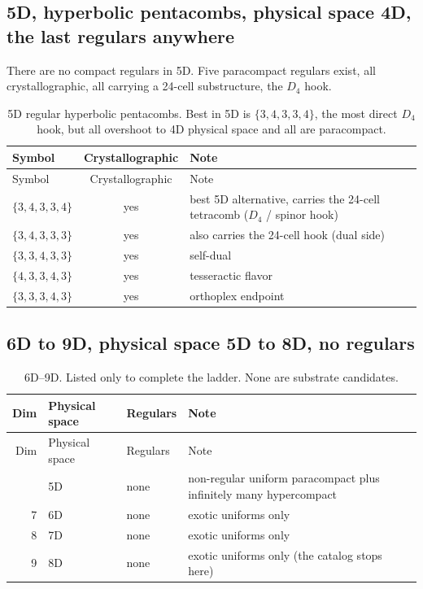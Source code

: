 \subsection{5D, hyperbolic pentacombs, physical space 4D, the last regulars anywhere}

There are no compact regulars in 5D. Five paracompact regulars exist, all crystallographic, all carrying a
24-cell substructure, the $D_4$ hook.

{\small
\begin{longtable}{l c p{4.0in}}
\caption{5D regular hyperbolic pentacombs. Best in 5D is $\{3,4,3,3,4\}$, the most direct $D_4$ hook, but all
overshoot to 4D physical space and all are paracompact.}
\label{tab:catalog-5d}\\
\toprule
Symbol & Crystallographic & Note \\
\midrule
\endfirsthead
\toprule
Symbol & Crystallographic & Note \\
\midrule
\endhead
\bottomrule
\endfoot
$\{3,4,3,3,4\}$ & yes & best 5D alternative, carries the 24-cell tetracomb ($D_4$ / spinor hook) \\
$\{3,4,3,3,3\}$ & yes & also carries the 24-cell hook (dual side) \\
$\{3,3,4,3,3\}$ & yes & self-dual \\
$\{4,3,3,4,3\}$ & yes & tesseractic flavor \\
$\{3,3,3,4,3\}$ & yes & orthoplex endpoint \\
\end{longtable}}

\subsection{6D to 9D, physical space 5D to 8D, no regulars}

{\small
\begin{longtable}{r l l p{3.2in}}
\caption{6D--9D. Listed only to complete the ladder. None are substrate candidates.}
\label{tab:catalog-6d-9d}\\
\toprule
Dim & Physical space & Regulars & Note \\
\midrule
\endfirsthead
\toprule
Dim & Physical space & Regulars & Note \\
\midrule
\endhead
\bottomrule
\endfoot
6 & 5D & none & non-regular uniform paracompact plus infinitely many hypercompact \\
7 & 6D & none & exotic uniforms only \\
8 & 7D & none & exotic uniforms only \\
9 & 8D & none & exotic uniforms only (the catalog stops here) \\
\end{longtable}}

